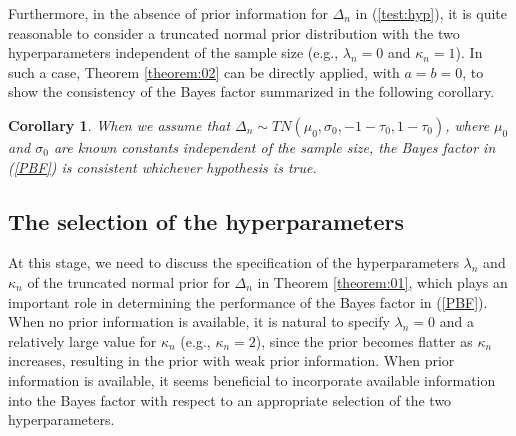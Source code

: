 \documentclass[11pt]{article}
\newcommand{\key}[1]{\textcolor{red}{#1}}
\newtheorem{corollary0}{Corollary}
\newenvironment{corollary}{\begin{corollary0} }{\end{corollary0}}
\newcommand{\ignore}[1]{}
\begin{document}
Furthermore, in the absence of prior information for $\Delta_n$ in (\ref{test:hyp}), it is quite reasonable to consider a truncated normal prior distribution with the two hyperparameters independent of the sample size (e.g., $\lambda_n =0$ and $\kappa_n = 1$). In such a case, Theorem \ref{theorem:02} can be directly applied, with $a = b = 0$, to show the consistency of the Bayes factor summarized in the following corollary.

\begin{corollary}\label{cor}
When we assume that $\Delta_n\sim TN(\mu_0,\sigma_0,-1-\tau_0,1-\tau_0)$, where $\mu_0$ and $\sigma_0$ are known constants independent of the sample size, the Bayes factor in (\ref{PBF}) is consistent whichever hypothesis is true.
\end{corollary}

\ignore{For the cases considered in literature, for instance, \cite{Yuan:John:2008}, they assume $\Delta_n =\frac{\Delta}{\sqrt{n}}$ with $\Delta$ following a standard normal distribution. This is a case when $\lambda_n =0$ and \key{need more descriptions}.}

\subsection{The selection of the hyperparameters} \label{section:02:03}

At this stage, we need to discuss the specification of the hyperparameters $\lambda_n$ and $\kappa_n$ of the truncated normal prior for $\Delta_n$ in Theorem \ref{theorem:01}, which plays an important role in determining the performance of the Bayes factor in (\ref{PBF}). When no prior information is available, it is natural to specify $\lambda_n = 0$ and a relatively large value for $\kappa_n$ (e.g., $\kappa_n = 2$), since the prior becomes flatter as $\kappa_n $ increases, resulting in the prior with weak prior information. When prior information is available, it seems beneficial to incorporate available information into the Bayes factor with respect to an appropriate selection of the two hyperparameters.
\end{document}
